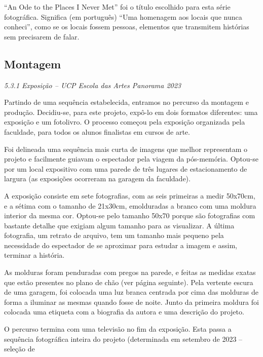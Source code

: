 \documentclass{article}
\begin{document}
 
“An  Ode  to  the  Places  I  Never  Met”  foi  o  título  escolhido  para  esta  série 
fotográfica. Significa (em português) “Uma homenagem aos locais que nunca conheci”, 
como se os locais fossem pessoas, elementos que transmitem histórias sem precisarem de 
falar. 
   
 
 



  
 
 



 
\subsection{{{Montagem}}}
\textit{5.3.1 Exposição – UCP Escola das Artes Panorama 2023 }
  
Partindo de uma sequência estabelecida, entramos no percurso da montagem e 
produção.  Decidiu-se,  para  este  projeto,  expô-lo  em  dois  formatos  diferentes:  uma 
exposição e um fotolivro. O processo começou pela exposição organizada pela faculdade, 
para todos os alunos finalistas em cursos de arte.  
 
Foi delineada uma sequência mais curta de imagens que melhor representam o 
projeto e facilmente guiavam o espectador pela viagem da pós-memória. Optou-se por 
um local expositivo com uma parede de três lugares de estacionamento de largura (as 
exposições ocorreram na garagem da faculdade).  
 
A exposição consiste em sete fotografias, com as seis primeiras a medir 50x70cm, 
e a sétima com o tamanho de 21x30cm, emolduradas a branco com uma moldura interior 
da mesma cor. Optou-se pelo tamanho 50x70 porque são fotografias com bastante detalhe 
que exigiam algum tamanho para as visualizar. A última fotografia, um retrato de arquivo, 
tem  um  tamanho  mais  pequeno  pela  necessidade  do  espectador  de  se  aproximar  para 
estudar a imagem e assim, terminar a história.   
 
As molduras foram penduradas com pregos na parede, e feitas as medidas exatas 
que estão presentes no plano de chão (ver página seguinte). Pela vertente escura de uma 
garagem,  foi  colocada  uma  luz  branca  centrada  por  cima  das  molduras  de  forma  a 
iluminar as mesmas quando fosse de noite. Junto da primeira moldura foi colocada uma 
etiqueta com a biografia da autora e uma descrição do projeto. 
 
 
 
 
O  percurso  termina  com  uma  televisão  no  fim  da  exposição.  Esta  passa  a 
sequência fotográfica inteira do projeto (determinada em setembro de 2023 – seleção de 
 
\end{document}
